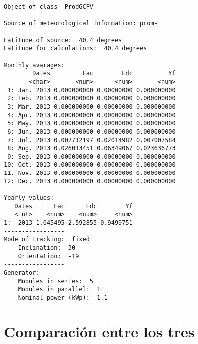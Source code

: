 \begin{verbatim}
Object of class  ProdGCPV 

Source of meteorological information: prom- 

Latitude of source:  40.4 degrees
Latitude for calculations:  40.4 degrees

Monthly avarages:
        Dates         Eac        Edc          Yf
       <char>       <num>      <num>       <num>
 1: Jan. 2013 0.000000000 0.00000000 0.000000000
 2: Feb. 2013 0.000000000 0.00000000 0.000000000
 3: Mar. 2013 0.000000000 0.00000000 0.000000000
 4: Apr. 2013 0.000000000 0.00000000 0.000000000
 5: May. 2013 0.000000000 0.00000000 0.000000000
 6: Jun. 2013 0.000000000 0.00000000 0.000000000
 7: Jul. 2013 0.007712197 0.02014982 0.007007584
 8: Aug. 2013 0.026013451 0.06349067 0.023636773
 9: Sep. 2013 0.000000000 0.00000000 0.000000000
10: Oct. 2013 0.000000000 0.00000000 0.000000000
11: Nov. 2013 0.000000000 0.00000000 0.000000000
12: Dec. 2013 0.000000000 0.00000000 0.000000000

Yearly values:
   Dates      Eac      Edc        Yf
   <int>    <num>    <num>     <num>
1:  2013 1.045495 2.592855 0.9499751
-----------------
Mode of tracking:  fixed 
    Inclination:  30 
    Orientation:  -19 
-----------------
Generator:
    Modules in series:  5 
    Modules in parallel:  1 
    Nominal power (kWp):  1.1
\end{verbatim}

\section{Comparación entre los tres}
\label{sec:org8c6ef73}
